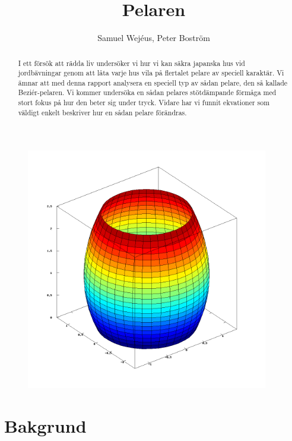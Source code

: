 \documentclass[a4paper,10pt]{article}
\title{Pelaren}
\author{Samuel Wejéus, Peter Boström}
\begin{document}
\setlength{\parindent}{0mm}
\setlength{\parskip}{3mm}

\maketitle
\thispagestyle{nofoot}

\vspace{2cm}

\begin{figure}[htp]
\centering
\includegraphics[height=300pt]{fig2}
\end{figure}

\newpage

\thispagestyle{nofoot}

\begin{abstract}
	\noindent I ett försök att rädda liv undersöker vi hur vi kan säkra japanska hus vid jordbävningar genom att låta varje hus vila på flertalet pelare av speciell karaktär. Vi ämnar att med denna rapport analysera en speciell typ av sådan pelare, den så kallade Beziér-pelaren. Vi kommer undersöka en sådan pelares stötdämpande förmåga med stort fokus på hur den beter sig under tryck. Vidare har vi funnit ekvationer som väldigt enkelt beskriver hur en sådan pelare förändras.
\end{abstract}

\newpage
\setcounter{page}{1}

\tableofcontents
\newpage

\section{Bakgrund}
\end{document}
